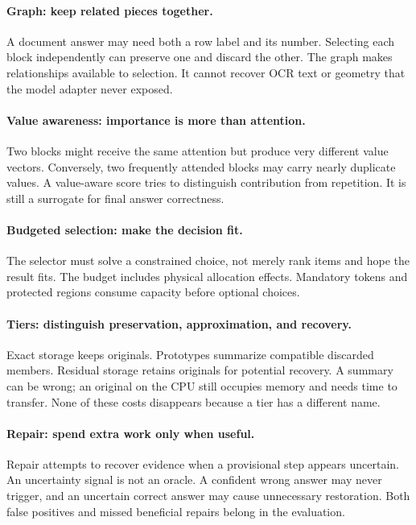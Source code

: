 \paragraph{Graph: keep related pieces together.}
A document answer may need both a row label and its number. Selecting each
block independently can preserve one and discard the other. The graph makes
relationships available to selection. It cannot recover OCR text or geometry
that the model adapter never exposed.

\paragraph{Value awareness: importance is more than attention.}
Two blocks might receive the same attention but produce very different value
vectors. Conversely, two frequently attended blocks may carry nearly duplicate
values. A value-aware score tries to distinguish contribution from repetition.
It is still a surrogate for final answer correctness.

\paragraph{Budgeted selection: make the decision fit.}
The selector must solve a constrained choice, not merely rank items and hope
the result fits. The budget includes physical allocation effects. Mandatory
tokens and protected regions consume capacity before optional choices.

\paragraph{Tiers: distinguish preservation, approximation, and recovery.}
Exact storage keeps originals. Prototypes summarize compatible discarded
members. Residual storage retains originals for potential recovery. A summary
can be wrong; an original on the CPU still occupies memory and needs time to
transfer. None of these costs disappears because a tier has a different name.

\paragraph{Repair: spend extra work only when useful.}
Repair attempts to recover evidence when a provisional step appears uncertain.
An uncertainty signal is not an oracle. A confident wrong answer may never
trigger, and an uncertain correct answer may cause unnecessary restoration.
Both false positives and missed beneficial repairs belong in the evaluation.

